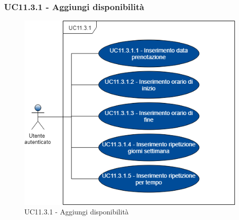 \subsubsection{UC11.3.1 - Aggiungi disponibilità}
\begin{figure}[H]
	\includegraphics[width=11cm]{res/images/UC11Aggiungi.png}
	\centering
	\caption{UC11.3.1 - Aggiungi disponibilità}
\end{figure}
